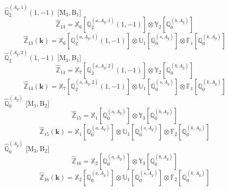 \documentclass[fleqn,10pt,landscape]{article}
\begin{document}
\begin{itemize}
\noindent {} $\,\,\,\hat{\mathbb{Q}}_{2}^{(A_{g},1)}(1,-1)$ [M$_{3}$,\,B$_{1}$]
\begin{dmath*}
\hat{\mathbb{Z}}_{13}=\mathbb{X}_{6}[\mathbb{Q}_{2}^{(a,A_{g},1)}(1,-1)] \otimes\mathbb{Y}_{2}[\mathbb{Q}_{0}^{(b,A_{g})}]
\end{dmath*}
\begin{dmath*}
\hat{\mathbb{Z}}_{13}(\bm{k})=\mathbb{X}_{6}[\mathbb{Q}_{2}^{(a,A_{g},1)}(1,-1)] \otimes\mathbb{U}_{1}[\mathbb{Q}_{0}^{(s,A_{g})}] \otimes\mathbb{F}_{1}[\mathbb{Q}_{0}^{(k,A_{g})}]
\end{dmath*}
\vspace{4mm}
\noindent {} $\,\,\,\hat{\mathbb{Q}}_{2}^{(A_{g},2)}(1,-1)$ [M$_{3}$,\,B$_{1}$]
\begin{dmath*}
\hat{\mathbb{Z}}_{14}=\mathbb{X}_{7}[\mathbb{Q}_{2}^{(a,A_{g},2)}(1,-1)] \otimes\mathbb{Y}_{2}[\mathbb{Q}_{0}^{(b,A_{g})}]
\end{dmath*}
\begin{dmath*}
\hat{\mathbb{Z}}_{14}(\bm{k})=\mathbb{X}_{7}[\mathbb{Q}_{2}^{(a,A_{g},2)}(1,-1)] \otimes\mathbb{U}_{1}[\mathbb{Q}_{0}^{(s,A_{g})}] \otimes\mathbb{F}_{1}[\mathbb{Q}_{0}^{(k,A_{g})}]
\end{dmath*}
\vspace{4mm}
\noindent {} $\,\,\,\hat{\mathbb{Q}}_{0}^{(A_{g})}$ [M$_{1}$,\,B$_{2}$]
\begin{dmath*}
\hat{\mathbb{Z}}_{15}=\mathbb{X}_{1}[\mathbb{Q}_{0}^{(a,A_{g})}] \otimes\mathbb{Y}_{3}[\mathbb{Q}_{0}^{(b,A_{g})}]
\end{dmath*}
\begin{dmath*}
\hat{\mathbb{Z}}_{15}(\bm{k})=\mathbb{X}_{1}[\mathbb{Q}_{0}^{(a,A_{g})}] \otimes\mathbb{U}_{1}[\mathbb{Q}_{0}^{(s,A_{g})}] \otimes\mathbb{F}_{2}[\mathbb{Q}_{0}^{(k,A_{g})}]
\end{dmath*}
\vspace{4mm}
\noindent {} $\,\,\,\hat{\mathbb{Q}}_{0}^{(A_{g})}$ [M$_{3}$,\,B$_{2}$]
\begin{dmath*}
\hat{\mathbb{Z}}_{16}=\mathbb{X}_{2}[\mathbb{Q}_{0}^{(a,A_{g})}] \otimes\mathbb{Y}_{3}[\mathbb{Q}_{0}^{(b,A_{g})}]
\end{dmath*}
\begin{dmath*}
\hat{\mathbb{Z}}_{16}(\bm{k})=\mathbb{X}_{2}[\mathbb{Q}_{0}^{(a,A_{g})}] \otimes\mathbb{U}_{1}[\mathbb{Q}_{0}^{(s,A_{g})}] \otimes\mathbb{F}_{2}[\mathbb{Q}_{0}^{(k,A_{g})}]
\end{dmath*}
\vspace{4mm}

\end{itemize}
\end{document}
